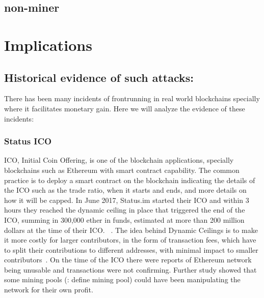 % 



\subsection{non-miner}
% 





\section{Implications} %

\subsection{Historical evidence of such attacks:}\par\noindent
There has been many incidents of frontrunning in real world blockchains specially where it facilitates monetary gain. Here we will analyze the evidence of these incidents:





\subsubsection{Status ICO}
ICO, Initial Coin Offering, is one of the blockchain applications, specially blockchains such as Ethereum with smart contract capability. The common practice is to deploy a smart contract on the blockchain indicating the details of the ICO such as the trade ratio, when it starts and ends, and more details on how it will be capped.
In June 2017, Status.im started their ICO and within 3 hours they reached the dynamic ceiling in place that triggered the end of the ICO, summing in 300,000 ether in funds, estimated at more than 200 million dollars at the time of their ICO. ~\cite{statusicoanalysis}. The idea behind Dynamic Ceilings is to make it more costly for larger contributors,  in the form of transaction fees, which have to split their contributions to different addresses, with minimal impact to smaller contributors~\cite{statuswhitepaper}.
On the time of the ICO there were reports of Ethereum network being unusable and transactions were not confirming. Further study showed that some mining pools (\todo: define mining pool) could have been manipulating the network for their own profit.

